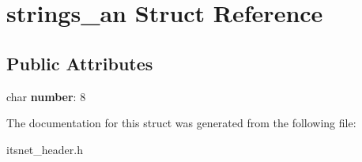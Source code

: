 \hypertarget{structstrings__an}{\section{strings\-\_\-an \-Struct \-Reference}
\label{structstrings__an}
}
\subsection*{\-Public \-Attributes}
\begin{DoxyCompactItemize}
\item 
\hypertarget{structstrings__an_ac4dc614ba3868ea28525e801cb5d0d13}{char {\bfseries number}\-: 8}\label{structstrings__an_ac4dc614ba3868ea28525e801cb5d0d13}

\end{DoxyCompactItemize}


\-The documentation for this struct was generated from the following file\-:\begin{DoxyCompactItemize}
\item 
itsnet\-\_\-header.\-h\end{DoxyCompactItemize}
